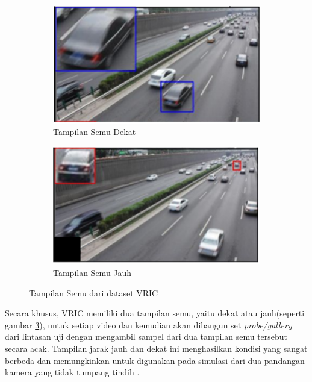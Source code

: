 \begin{figure}[h!]
  \centering
  \begin{subfigure}{.5\textwidth}
    \centering
    \includegraphics[width=.8\linewidth]{gambar/tampilansemudekat.png}
    \caption{Tampilan Semu Dekat}
    \label{fig:tampilansemudekat}
  \end{subfigure}%
  \begin{subfigure}{.5\textwidth}
    \centering
    \includegraphics[width=.8\linewidth]{gambar/tampilansemujauh.png}
    \caption{Tampilan Semu Jauh}
    \label{tampilansemujauh}
  \end{subfigure}
  \caption{Tampilan Semu dari dataset VRIC}
  \label{fig:tampilansemudaridatasetvric}
\end{figure}

Secara khusus, VRIC memiliki dua tampilan semu, yaitu dekat atau jauh(seperti gambar \ref{fig:tampilansemudaridatasetvric}), untuk setiap video dan kemudian akan dibangun set \emph{probe/gallery} dari lintasan uji dengan mengambil sampel 
dari dua tampilan semu tersebut secara acak. Tampilan jarak jauh dan dekat ini menghasilkan kondisi yang sangat berbeda dan memungkinkan untuk digunakan pada simulasi dari dua pandangan 
kamera yang tidak tumpang tindih \parencite{Kanaci2018}.



